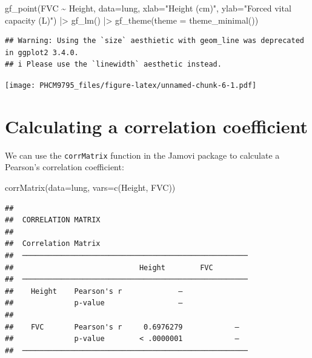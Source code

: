 \documentclass[
]{memoir}
\newenvironment{Shaded}{\begin{snugshade}}{\end{snugshade}}
\newcommand{\AttributeTok}[1]{\textcolor[rgb]{0.77,0.63,0.00}{#1}}
\newcommand{\FunctionTok}[1]{\textcolor[rgb]{0.00,0.00,0.00}{#1}}
\newcommand{\NormalTok}[1]{#1}
\newcommand{\SpecialCharTok}[1]{\textcolor[rgb]{0.00,0.00,0.00}{#1}}
\newcommand{\StringTok}[1]{\textcolor[rgb]{0.31,0.60,0.02}{#1}}
\begin{document}
\begin{Shaded}
\begin{Highlighting}[]
\FunctionTok{gf\_point}\NormalTok{(FVC }\SpecialCharTok{\textasciitilde{}}\NormalTok{ Height, }\AttributeTok{data=}\NormalTok{lung,}
     \AttributeTok{xlab=}\StringTok{"Height (cm)"}\NormalTok{, }
     \AttributeTok{ylab=}\StringTok{"Forced vital capacity (L)"}\NormalTok{) }\SpecialCharTok{|\textgreater{}}
  \FunctionTok{gf\_lm}\NormalTok{() }\SpecialCharTok{|\textgreater{}}
  \FunctionTok{gf\_theme}\NormalTok{(}\AttributeTok{theme =} \FunctionTok{theme\_minimal}\NormalTok{())}
\end{Highlighting}
\end{Shaded}

\begin{verbatim}
## Warning: Using the `size` aesthietic with geom_line was deprecated in ggplot2 3.4.0.
## i Please use the `linewidth` aesthetic instead.
\end{verbatim}

\texttt{[image: PHCM9795\_files/figure-latex/unnamed-chunk-6-1.pdf]}

\hypertarget{calculating-a-correlation-coefficient-1}{%
\section*{Calculating a correlation coefficient}\label{calculating-a-correlation-coefficient-1}}

We can use the \texttt{corrMatrix} function in the Jamovi package to calculate a Pearson's correlation coefficient:

\begin{Shaded}
\begin{Highlighting}[]
\FunctionTok{corrMatrix}\NormalTok{(}\AttributeTok{data=}\NormalTok{lung, }\AttributeTok{vars=}\FunctionTok{c}\NormalTok{(Height, FVC))}
\end{Highlighting}
\end{Shaded}

\begin{verbatim}
## 
##  CORRELATION MATRIX
## 
##  Correlation Matrix                                   
##  ──────────────────────────────────────────────────── 
##                             Height        FVC         
##  ──────────────────────────────────────────────────── 
##    Height    Pearson's r             —                
##              p-value                 —                
##                                                       
##    FVC       Pearson's r     0.6976279            —   
##              p-value        < .0000001            —   
##  ────────────────────────────────────────────────────
\end{verbatim}
\end{document}
